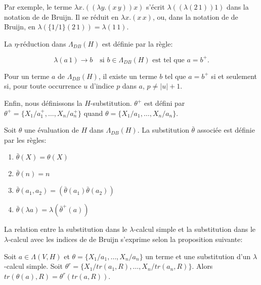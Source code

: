 Par exemple, le terme $\lambda x . (( \lambda y . (x \, y)) x)$ s’écrit $\lambda (( \lambda (2 \, 1))1)$ dans la notation de de Bruijn. Il se réduit en $\lambda x . (x \, x)$, ou, dans la notation de de Bruijn, en $\lambda (\{1/1\}(2 \, 1)) = \lambda (1 \, 1)$.

\begin{defn}
La $\eta$-réduction dans $\Lambda_{DB}(H)$ est définie par la règle:

\[ \lambda (a \, 1) \xrightarrow{}{b} \quad \text{si $b \in \Lambda_{DB}(H)$ est tel que $a = b^{+}$.} \]

\end{defn}

\begin{prop}
Pour un terme $a$ de $\Lambda_{DB}(H)$, il existe un terme $b$ tel que $a=b^{+}$ si et seulement si, pour toute occurrence $u$ d’indice $p$ dans $a$, $p \neq |u| + 1$.
\end{prop}

Enfin, nous définissons la $H$-substitution. $\theta^{+}$ est défini par $\theta^{+} = \{X_1/a_1^{+}, \dots, X_n/a_n^{+}\}$ quand $\theta = \{X_1/a_1, \dots , X_n/a_n\}$.

\begin{defn}
Soit $\theta$ une évaluation de $H$ dans $\Lambda_{DB}(H)$. La substitution $\bar{\theta}$ associée est définie par les règles:
\begin{enumerate}
    \item $\bar{\theta} (X) = \theta (X)$
    \item $\bar{\theta} (n) = n$
    \item $\bar{\theta} (a_1,a_2) = (\bar{\theta} (a_1) \bar{\theta} (a_2))$
    \item $\bar{\theta} (\lambda a) = \lambda (\bar{\theta}^{+} (a))$
\end{enumerate}
\end{defn}

La relation entre la substitution dans le $\lambda$-calcul simple et la substitution dans le $\lambda$-calcul avec les indices de de Bruijn s’exprime selon la proposition suivante:

\begin{prop}
Soit $a \in \Lambda(V,H)$ et $\theta = \{ X_1/a_1, \dots, X_n / a_n \}$ un terme et une substitution d’un $\lambda$-calcul simple. Soit $\theta^{r} = \{ X_1 / tr(a_1,R), \dots, X_n / tr(a_n,R) \}$. Alors $tr(\theta (a),R) = \theta^{r}(tr(a,R))$.
\end{prop}

